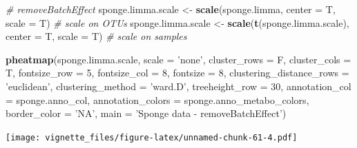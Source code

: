 \documentclass[]{book}
\newenvironment{Shaded}{\begin{snugshade}}{\end{snugshade}}
\newcommand{\KeywordTok}[1]{\textcolor[rgb]{0.13,0.29,0.53}{\textbf{#1}}}
\newcommand{\DataTypeTok}[1]{\textcolor[rgb]{0.13,0.29,0.53}{#1}}
\newcommand{\DecValTok}[1]{\textcolor[rgb]{0.00,0.00,0.81}{#1}}
\newcommand{\StringTok}[1]{\textcolor[rgb]{0.31,0.60,0.02}{#1}}
\newcommand{\CommentTok}[1]{\textcolor[rgb]{0.56,0.35,0.01}{\textit{#1}}}
\newcommand{\NormalTok}[1]{#1}
\begin{document}
\begin{Shaded}
\begin{Highlighting}[]
\CommentTok{# removeBatchEffect}
\NormalTok{sponge.limma.scale <-}\StringTok{ }\KeywordTok{scale}\NormalTok{(sponge.limma, }\DataTypeTok{center =}\NormalTok{ T, }\DataTypeTok{scale =}\NormalTok{ T) }
\CommentTok{# scale on OTUs}
\NormalTok{sponge.limma.scale <-}\StringTok{ }\KeywordTok{scale}\NormalTok{(}\KeywordTok{t}\NormalTok{(sponge.limma.scale), }\DataTypeTok{center =}\NormalTok{ T, }\DataTypeTok{scale =}\NormalTok{ T) }
\CommentTok{# scale on samples}

\KeywordTok{pheatmap}\NormalTok{(sponge.limma.scale, }
         \DataTypeTok{scale =} \StringTok{'none'}\NormalTok{, }
         \DataTypeTok{cluster_rows =}\NormalTok{ F, }
         \DataTypeTok{cluster_cols =}\NormalTok{ T, }
         \DataTypeTok{fontsize_row =} \DecValTok{5}\NormalTok{, }\DataTypeTok{fontsize_col =} \DecValTok{8}\NormalTok{,}
         \DataTypeTok{fontsize =} \DecValTok{8}\NormalTok{,}
         \DataTypeTok{clustering_distance_rows =} \StringTok{'euclidean'}\NormalTok{,}
         \DataTypeTok{clustering_method =} \StringTok{'ward.D'}\NormalTok{,}
         \DataTypeTok{treeheight_row =} \DecValTok{30}\NormalTok{,}
         \DataTypeTok{annotation_col =}\NormalTok{ sponge.anno_col,}
         \DataTypeTok{annotation_colors =}\NormalTok{ sponge.anno_metabo_colors,}
         \DataTypeTok{border_color =} \StringTok{'NA'}\NormalTok{,}
         \DataTypeTok{main =} \StringTok{'Sponge data - removeBatchEffect'}\NormalTok{)}
\end{Highlighting}
\end{Shaded}

\texttt{[image: vignette\_files/figure-latex/unnamed-chunk-61-4.pdf]}
\end{document}
